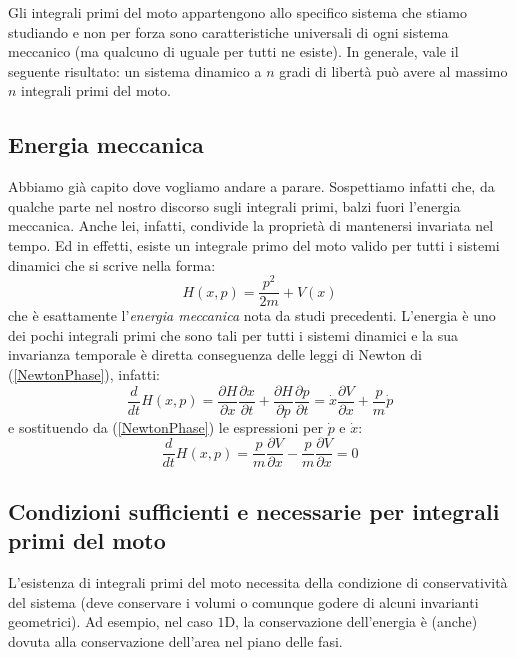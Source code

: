 \documentclass[a4paper,openany]{article}
\begin{document}
	
	Gli integrali primi del moto appartengono allo specifico sistema che stiamo studiando e non per forza sono caratteristiche universali di ogni sistema meccanico (ma qualcuno di uguale per tutti ne esiste). In generale, vale il seguente risultato: un sistema dinamico a $n$ gradi di libertà può avere al massimo $n$ integrali primi del moto.
	\subsection{Energia meccanica}
	Abbiamo già capito dove vogliamo andare a parare. Sospettiamo infatti che, da qualche parte nel nostro discorso sugli integrali primi, balzi fuori l'energia meccanica. Anche lei, infatti, condivide la proprietà di mantenersi invariata nel tempo. Ed in effetti, esiste un integrale primo del moto valido per tutti i sistemi dinamici che si scrive nella forma:
	\begin{equation}
		H(x,p) = \dfrac{p^{2}}{2m} + V(x)
	\end{equation}
	che è esattamente l'\textit{energia meccanica} nota da studi precedenti. L'energia è uno dei pochi integrali primi che sono tali per tutti i sistemi dinamici e la sua invarianza temporale è diretta conseguenza delle leggi di Newton di (\ref{NewtonPhase}), infatti:
	$$
	\dfrac{d}{dt}H(x,p) = \dfrac{\partial H}{\partial x} \dfrac{\partial x}{\partial t} + \dfrac{\partial H}{\partial p}\dfrac{\partial p}{\partial t} = \dot{x}\dfrac{\partial V}{\partial x}+\dfrac{p}{m}\dot{p}
	$$
	e sostituendo da (\ref{NewtonPhase}) le espressioni per $\dot{p}$ e $\dot{x}$:
	$$
	\dfrac{d}{dt}H(x,p) = \dfrac{p}{m}\dfrac{\partial V}{\partial x} - \dfrac{p}{m}\dfrac{\partial V}{\partial x} = 0
	$$
	\subsection{Condizioni sufficienti e necessarie per integrali primi del moto}
	L'esistenza di integrali primi del moto necessita della condizione di conservatività del sistema (deve conservare i volumi o comunque godere di alcuni invarianti geometrici). Ad esempio, nel caso $1$D, la conservazione dell'energia è (anche) dovuta alla conservazione dell'area nel piano delle fasi. 
	
\end{document}
